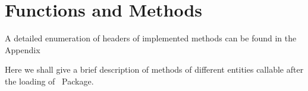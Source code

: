 \documentclass{book}
\begin{document}
\section{Functions and Methods}

A detailed enumeration of headers of implemented methods can be found in the Appendix 

Here we shall give a brief description of methods of different entities callable after the loading of \ssimul\, Package.
\subsection*{\algo}


\end{document}
